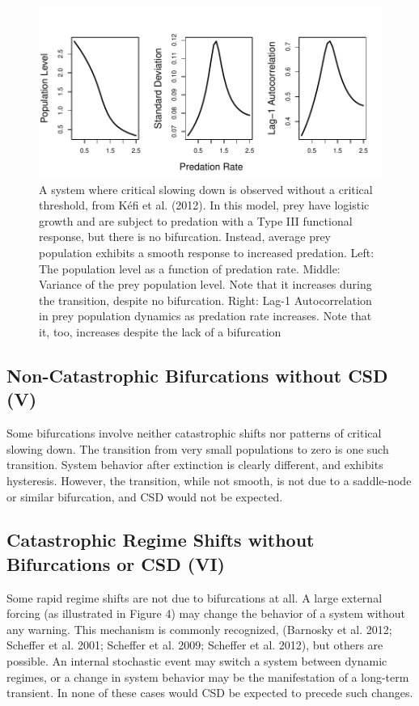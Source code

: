 \documentclass[author-year, review]{elsarticle} %
\makeatletter
\def\maxwidth{\ifdim\Gin@nat@width>\linewidth\linewidth
\else\Gin@nat@width\fi}
\let\Oldincludegraphics\includegraphics
\renewcommand{\includegraphics}[1]{\Oldincludegraphics[width=\maxwidth]{#1}}
\makeatother
\begin{document}
\begin{figure}[htbp]
\centering
\includegraphics{kefi-fig.pdf}
\caption{A system where critical slowing down is observed without a
critical threshold, from Kéfi et al. (2012). In this model, prey have
logistic growth and are subject to predation with a Type III functional
response, but there is no bifurcation. Instead, average prey population
exhibits a smooth response to increased predation. Left: The population
level as a function of predation rate. Middle: Variance of the prey
population level. Note that it increases during the transition, despite
no bifurcation. Right: Lag-1 Autocorrelation in prey population dynamics
as predation rate increases. Note that it, too, increases despite the
lack of a bifurcation}
\end{figure}

\subsection{Non-Catastrophic Bifurcations without CSD (V)}

Some bifurcations involve neither catastrophic shifts nor patterns of
critical slowing down. The transition from very small populations to
zero is one such transition. System behavior after extinction is clearly
different, and exhibits hysteresis. However, the transition, while not
smooth, is not due to a saddle-node or similar bifurcation, and CSD
would not be expected.

\subsection{Catastrophic Regime Shifts without Bifurcations or CSD (VI)}

Some rapid regime shifts are not due to bifurcations at all. A large
external forcing (as illustrated in Figure 4) may change the behavior of
a system without any warning. This mechanism is commonly recognized,
(Barnosky et al. 2012; Scheffer et al. 2001; Scheffer et al. 2009;
Scheffer et al. 2012), but others are possible. An internal stochastic
event may switch a system between dynamic regimes, or a change in system
behavior may be the manifestation of a long-term transient. In none of
these cases would CSD be expected to precede such changes.
\end{document}
